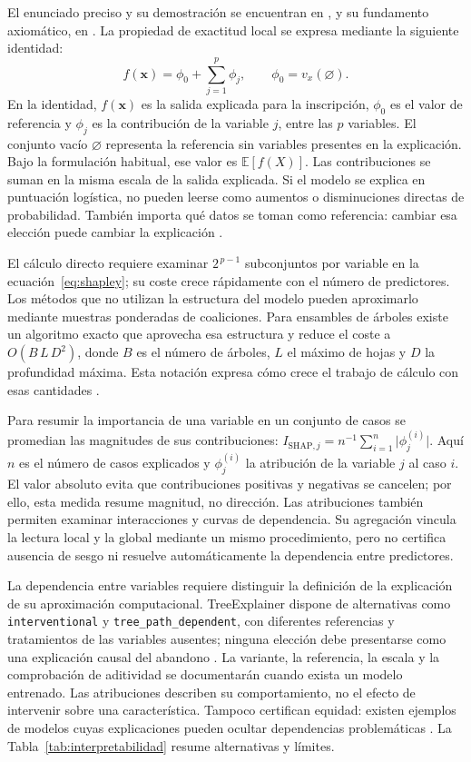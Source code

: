 El enunciado preciso y su demostración se encuentran en \cite{lundberg2017}, y su fundamento axiomático, en \cite{shapley1953}. La propiedad de exactitud local se expresa mediante la siguiente identidad:
\begin{equation}\label{eq:shap-aditivo}
f(\mathbf{x})=\phi_{0}+\sum_{j=1}^{p}\phi_{j},
\qquad
\phi_{0}=v_x(\varnothing).
\end{equation}
En la identidad, $f(\mathbf x)$ es la salida explicada para la inscripción, $\phi_0$ es el valor de referencia y $\phi_j$ es la contribución de la variable $j$, entre las $p$ variables. El conjunto vacío $\varnothing$ representa la referencia sin variables presentes en la explicación. Bajo la formulación habitual, ese valor es $\mathbb{E}[f(X)]$. Las contribuciones se suman en la misma escala de la salida explicada. Si el modelo se explica en puntuación logística, no pueden leerse como aumentos o disminuciones directas de probabilidad. También importa qué datos se toman como referencia: cambiar esa elección puede cambiar la explicación \cite{revshapdocs}.

El cálculo directo requiere examinar $2^{\,p-1}$ subconjuntos por variable en la ecuación~\eqref{eq:shapley}; su coste crece rápidamente con el número de predictores. Los métodos que no utilizan la estructura del modelo pueden aproximarlo mediante muestras ponderadas de coaliciones. Para ensambles de árboles existe un algoritmo exacto que aprovecha esa estructura y reduce el coste a $O(B\,L\,D^{2})$, donde $B$ es el número de árboles, $L$ el máximo de hojas y $D$ la profundidad máxima. Esta notación expresa cómo crece el trabajo de cálculo con esas cantidades \cite{lundberg2020}.

Para resumir la importancia de una variable en un conjunto de casos se promedian las magnitudes de sus contribuciones: $I_{\mathrm{SHAP},j}=n^{-1}\sum_{i=1}^{n}\big|\phi_{j}^{(i)}\big|$. Aquí $n$ es el número de casos explicados y $\phi_j^{(i)}$ la atribución de la variable $j$ al caso $i$. El valor absoluto evita que contribuciones positivas y negativas se cancelen; por ello, esta medida resume magnitud, no dirección. Las atribuciones también permiten examinar interacciones y curvas de dependencia. Su agregación vincula la lectura local y la global mediante un mismo procedimiento, pero no certifica ausencia de sesgo ni resuelve automáticamente la dependencia entre predictores.

La dependencia entre variables requiere distinguir la definición de la explicación de su aproximación computacional. TreeExplainer dispone de alternativas como \texttt{interventional} y \texttt{tree\_path\_dependent}, con diferentes referencias y tratamientos de las variables ausentes; ninguna elección debe presentarse como una explicación causal del abandono \cite{revshapdocs,aas2021}. La variante, la referencia, la escala y la comprobación de aditividad se documentarán cuando exista un modelo entrenado. Las atribuciones describen su comportamiento, no el efecto de intervenir sobre una característica. Tampoco certifican equidad: existen ejemplos de modelos cuyas explicaciones pueden ocultar dependencias problemáticas \cite{slack2020}. La Tabla~\ref{tab:interpretabilidad} resume alternativas y límites.

